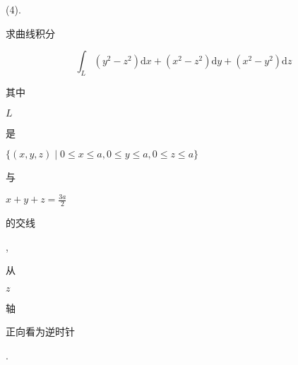 \documentclass[10pt]{article}
\begin{document}
(4). \begin{CJK}{UTF8}{mj}求曲线积分\end{CJK}
$$
\int_{L}\left(y^{2}-z^{2}\right) \mathrm{d} x+\left(x^{2}-z^{2}\right) \mathrm{d} y+\left(x^{2}-y^{2}\right) \mathrm{d} z
$$
\begin{CJK}{UTF8}{mj}其中\end{CJK} $L$ \begin{CJK}{UTF8}{mj}是\end{CJK} $\{(x, y, z) \mid 0 \leq x \leq a, 0 \leq y \leq a, 0 \leq z \leq a\}$ \begin{CJK}{UTF8}{mj}与\end{CJK} $x+y+z=\frac{3 a}{2}$ \begin{CJK}{UTF8}{mj}的交线\end{CJK}, \begin{CJK}{UTF8}{mj}从\end{CJK} $z$ \begin{CJK}{UTF8}{mj}轴\end{CJK} \begin{CJK}{UTF8}{mj}正向看为逆时针\end{CJK}.
\end{document}
